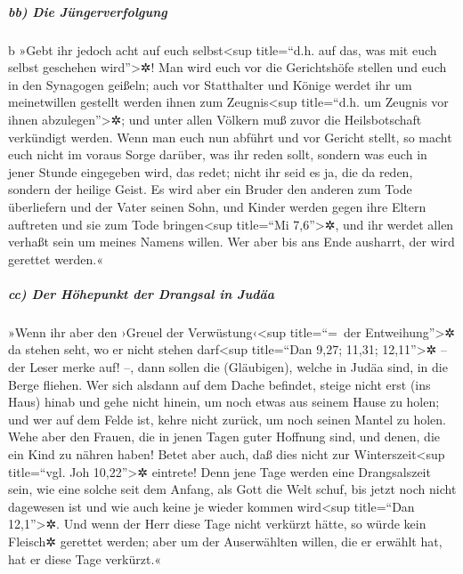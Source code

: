 \hypertarget{bb-die-juxfcngerverfolgung}{%
\subparagraph{bb) Die
Jüngerverfolgung}\label{bb-die-juxfcngerverfolgung}}

b »Gebt ihr jedoch acht auf euch selbst\textless sup title=``d.h. auf
das, was mit euch selbst geschehen wird''\textgreater✲! Man wird euch
vor die Gerichtshöfe stellen und euch in den Synagogen geißeln; auch vor
Statthalter und Könige werdet ihr um meinetwillen gestellt werden ihnen
zum Zeugnis\textless sup title=``d.h. um Zeugnis vor ihnen
abzulegen''\textgreater✲;  und unter allen Völkern muß
zuvor die Heilsbotschaft verkündigt werden.  Wenn man
euch nun abführt und vor Gericht stellt, so macht euch nicht im voraus
Sorge darüber, was ihr reden sollt, sondern was euch in jener Stunde
eingegeben wird, das redet; nicht ihr seid es ja, die da reden, sondern
der heilige Geist.  Es wird aber ein Bruder den anderen
zum Tode überliefern und der Vater seinen Sohn, und Kinder werden gegen
ihre Eltern auftreten und sie zum Tode bringen\textless sup title=``Mi
7,6''\textgreater✲,  und ihr werdet allen verhaßt sein um
meines Namens willen. Wer aber bis ans Ende ausharrt, der wird gerettet
werden.«

\hypertarget{cc-der-huxf6hepunkt-der-drangsal-in-juduxe4a}{%
\subparagraph{cc) Der Höhepunkt der Drangsal in
Judäa}\label{cc-der-huxf6hepunkt-der-drangsal-in-juduxe4a}}

 »Wenn ihr aber den ›Greuel der Verwüstung‹\textless sup
title=``=~der Entweihung''\textgreater✲ da stehen seht, wo er nicht
stehen darf\textless sup title=``Dan 9,27; 11,31; 12,11''\textgreater✲
-- der Leser merke auf! --, dann sollen die (Gläubigen), welche in Judäa
sind, in die Berge fliehen.  Wer sich alsdann auf dem
Dache befindet, steige nicht erst (ins Haus) hinab und gehe nicht
hinein, um noch etwas aus seinem Hause zu holen;  und wer
auf dem Felde ist, kehre nicht zurück, um noch seinen Mantel zu holen.
 Wehe aber den Frauen, die in jenen Tagen guter Hoffnung
sind, und denen, die ein Kind zu nähren haben!  Betet
aber auch, daß dies nicht zur Winterszeit\textless sup title=``vgl. Joh
10,22''\textgreater✲ eintrete!  Denn jene Tage werden
eine Drangsalszeit sein, wie eine solche seit dem Anfang, als Gott die
Welt schuf, bis jetzt noch nicht dagewesen ist und wie auch keine je
wieder kommen wird\textless sup title=``Dan 12,1''\textgreater✲.
 Und wenn der Herr diese Tage nicht verkürzt hätte, so
würde kein Fleisch✲ gerettet werden; aber um der Auserwählten willen,
die er erwählt hat, hat er diese Tage verkürzt.«

